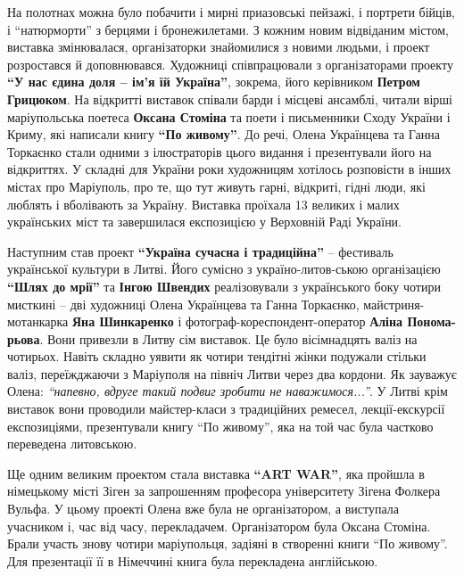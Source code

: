 На полотнах можна було побачити і мирні приазовські пейзажі, і портрети бійців,
і \enquote{натюрморти} з берцями і бронежилетами. З кожним новим відвіданим містом,
виставка змінювалася, організаторки знайомилися з новими людьми, і проект
розростався й доповнювався. Художниці співпрацювали з організаторами проекту \textbf{\enquote{У
нас єдина доля – ім'я їй Україна}}, зокрема, його керівником \textbf{Петром Грицюком}. На
відкритті виставок співали барди і місцеві ансамблі, читали вірші маріупольська
поетеса \textbf{Оксана Стоміна} та поети і письменники Сходу України і Криму, які
написали книгу \textbf{\enquote{По живому}}. До речі, Олена Українцева та Ганна Торкаєнко стали
одними з ілюстраторів цього видання і презентували його на відкриттях. У
складні для України роки художницям хотілось розповісти в інших містах про
Маріуполь, про те, що тут живуть гарні, відкриті, гідні люди, які люблять і
вболівають за Україну. Виставка проїхала 13 великих і малих українських міст та
завершилася експозицією у Верховній Раді України.


Наступним став проект \textbf{\enquote{Україна сучасна і традиційна}} – фестиваль української
культури в Литві. Його сумісно з україно-литов\hyp{}ською організацією \textbf{\enquote{Шлях до мрії}}
та \textbf{Інгою Швендих} реалізовували з українського боку чотири мисткині – дві
художниці Олена Українцева та Ганна Торкаєнко, майстриня-мотанкарка \textbf{Яна
Шинкаренко} і фотограф-кореспондент-оператор \textbf{Аліна Понома\hyp{}рьова}. Вони привезли в
Литву сім виставок. Це було вісімнадцять валіз на чотирьох. Навіть складно
уявити як чотири тендітні жінки подужали стільки валіз, переїжджаючи з
Маріуполя на північ Литви через два кордони. Як зауважує Олена: \emph{\enquote{напевно,
вдруге такий подвиг зробити не наважимося...}}. У Литві крім виставок вони
проводили майстер-класи з традиційних ремесел, лекції-екскурсії експозиціями,
презентували книгу \enquote{По живому}, яка на той час була частково переведена
литовською.

\medskip
{}
\medskip


Ще одним великим проектом стала виставка \textbf{\enquote{ART WAR}}, яка пройшла в німецькому
місті Зіген за запрошенням професора університету Зігена Фолкера Вульфа. У
цьому проекті Олена вже була не організатором, а виступала учасником і, час від
часу, перекладачем. Організатором була Оксана Стоміна. Брали участь знову
чотири маріупольця, задіяні в створенні книги \enquote{По живому}. Для презентації її в
Німеччині книга була перекладена англійською.

